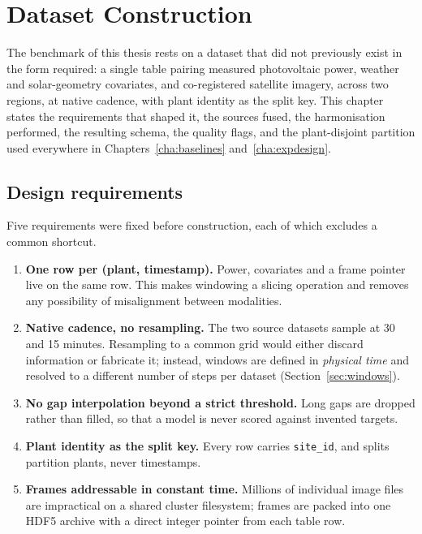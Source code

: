 \chapter{Dataset Construction}
\label{cha:dataset}

The benchmark of this thesis rests on a dataset that did not previously exist in the form
required: a single table pairing measured photovoltaic power, weather and solar-geometry
covariates, and co-registered satellite imagery, across two regions, at native cadence,
with plant identity as the split key. This chapter states the requirements that shaped it,
the sources fused, the harmonisation performed, the resulting schema, the quality flags,
and the plant-disjoint partition used everywhere in Chapters~\ref{cha:baselines}
and~\ref{cha:expdesign}.

\section{Design requirements}
\label{sec:data-requirements}

Five requirements were fixed before construction, each of which excludes a common shortcut.

\begin{enumerate}
  \item \textbf{One row per (plant, timestamp).} Power, covariates and a frame pointer live
    on the same row. This makes windowing a slicing operation and removes any possibility
    of misalignment between modalities.
  \item \textbf{Native cadence, no resampling.} The two source datasets sample at 30 and 15
    minutes. Resampling to a common grid would either discard information or fabricate it;
    instead, windows are defined in \emph{physical time} and resolved to a different number
    of steps per dataset (Section~\ref{sec:windows}).
  \item \textbf{No gap interpolation beyond a strict threshold.} Long gaps are dropped
    rather than filled, so that a model is never scored against invented targets.
  \item \textbf{Plant identity as the split key.} Every row carries \texttt{site\_id}, and
    splits partition plants, never timestamps.
  \item \textbf{Frames addressable in constant time.} Millions of individual image files
    are impractical on a shared cluster filesystem; frames are packed into one HDF5 archive
    with a direct integer pointer from each table row.
\end{enumerate}

